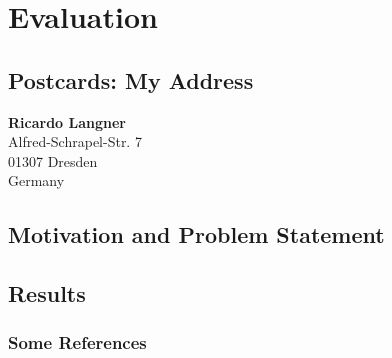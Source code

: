 %
\chapter{Evaluation}
\label{sec:evaluation}


\Blindtext[2][2]

\section{Postcards: My Address}
\label{sec:evaluation:address}

\textbf{Ricardo Langner} \\
Alfred-Schrapel-Str. 7 \\
01307 Dresden \\
Germany


\section{Motivation and Problem Statement}
\label{sec:evaluation:motivation}

\Blindtext[3][1] 

\section{Results}
\label{sec:evaluation:results}

\Blindtext[1][2]

\subsection{Some References}
\label{sec:evaluation:results:refs}
